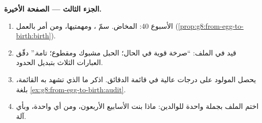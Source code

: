 \begin{problem}
\medskip\noindent\textbf{الجزء الثالث --- الصفحة الأخيرة.}
\begin{enumerate}[resume]
  \item الأسبوع 40: المخاض. سمّ ، ومهمتيها، ومن أمر
        بالعمل (\cref{prop:g8:from-egg-to-birth:birth}).
  \item قيد  في الملف: ``صرخة قوية في الحال؛ الحبل
        مشبوك ومقطوع؛  تامة.'' دقّق العبارات
        الثلاث بتبديل الحدود.
  \item يحصل المولود على درجات عالية في قائمة الدقائق.
        اذكر ما الذي تشهد به القائمة، بلغة
        \cref{ex:g8:from-egg-to-birth:audit}.
  \item اختم الملف بجملة واحدة للوالدين: ماذا بنت
        الأسابيع الأربعون، ومن أي  واحدة، وبأي آلة.
\end{enumerate}
\end{problem}
